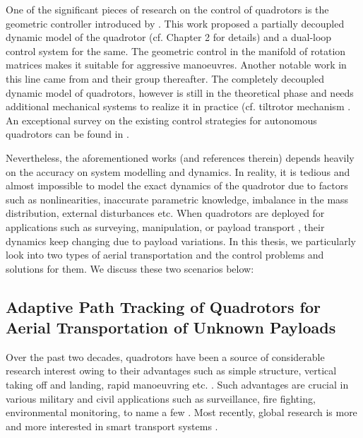  One of the significant pieces of research on the control of quadrotors is the geometric controller introduced by \cite{lee2010geometric}. This work proposed a partially decoupled dynamic model of the quadrotor (cf. Chapter 2 for details) and a dual-loop control system for the same. The geometric control in the manifold of rotation matrices makes it suitable for aggressive manoeuvres. Another notable work in this line came from \cite{mellinger2011minimum} and their group thereafter. The completely decoupled dynamic model of quadrotors, however is still in the theoretical phase and needs additional mechanical systems to realize it in practice (cf. tiltrotor mechanism \cite{8688053, 8815013}. An exceptional survey on the existing control strategies for autonomous quadrotors can be found in \cite{kimsurvey}.

Nevertheless, the aforementioned works (and references therein) depends heavily on the accuracy on system modelling and dynamics. In reality, it is tedious and almost impossible to model the exact dynamics of the quadrotor due to factors such as nonlinearities, inaccurate parametric knowledge, imbalance in the mass distribution, external disturbances etc. When quadrotors are deployed for applications such as surveying, manipulation, or payload transport \cite{aerial_mani, tang2015mixed, yang2019energy}, their dynamics keep changing due to payload variations. In this thesis, we particularly look into two types of aerial transportation and the control problems and solutions for them. We discuss these two scenarios below:

\subsection{Adaptive Path Tracking of Quadrotors for Aerial Transportation of Unknown Payloads} \label{motive_1}
Over the past two decades, quadrotors have been a source of considerable research interest owing to their advantages such as simple structure, vertical taking off and landing, rapid manoeuvring etc. \cite{fusini2018nonlinear, kapoutsis2013autonomous, nazaruddin2018communication}. Such advantages are crucial in various military and civil applications such as surveillance, fire fighting, environmental monitoring, to name a few \cite{invernizzi2019dynamic, invernizzi2019integral}. Most recently, global research is more and more interested in smart transport systems \cite{tang2015mixed, yang2019energy}.

